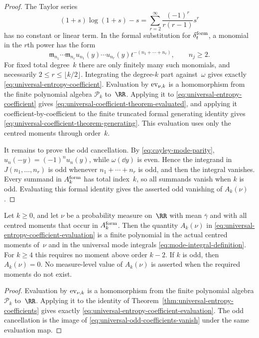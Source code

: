 \begin{proof}
The Taylor series
\[
(1+s)\log(1+s)-s
=\sum_{r=2}^{\infty}\frac{(-1)^r}{r(r-1)}s^r
\]
has no constant or linear term.  In the formal substitution for
$\delta_t^{\rm form}$, a monomial in the $r$th power has the form
\[
\mathfrak m_{n_1}\cdots\mathfrak m_{n_r}
u_{n_1}(y)\cdots u_{n_r}(y)t^{-(n_1+\cdots+n_r)},
\qquad n_j\ge2.
\]
For fixed total degree~$k$ there are only finitely many such monomials, and
necessarily $2\le r\le\lfloor k/2\rfloor$.  Integrating the degree-$k$ part
against~$\omega$ gives exactly \eqref{eq:universal-entropy-coefficient}.
Evaluation by ${\rm ev}_{\nu,k}$ is a homomorphism from the finite polynomial
algebra $\mathcal P_k$ to~$\RR$.  Applying it to
\eqref{eq:universal-entropy-coefficient} gives
\eqref{eq:universal-coefficient-theorem-evaluated}, and applying it
coefficient-by-coefficient to the finite truncated formal generating identity
gives \eqref{eq:universal-coefficient-theorem-generating}.  This evaluation
uses only the centred moments through order~$k$.

It remains to prove the odd cancellation.  By
\eqref{eq:cayley-mode-parity}, $u_n(-y)=(-1)^n u_n(y)$, while
$\omega(\dd y)$ is even.  Hence the integrand in
$J(n_1,\dots,n_r)$ is odd whenever $n_1+\cdots+n_r$ is odd, and then the
integral vanishes.  Every summand in $A_k^{\rm form}$ has total index~$k$, so
all summands vanish when $k$ is odd.  Evaluating this formal identity gives
the asserted odd vanishing of $A_k(\nu)$.
\end{proof}

\begin{proposition}%
\label{prop:universal-entropy-coefficient-evaluation}
Let $k\ge0$, and let $\nu$ be a probability measure on~$\RR$ with mean
$\bar{\gamma}$ and with all centred moments that occur in
$A_k^{\rm form}$.  Then the quantity $A_k(\nu)$ in
\eqref{eq:universal-entropy-coefficient-evaluation} is a finite polynomial in
the actual centred moments of~$\nu$ and in the universal mode integrals
\eqref{eq:mode-integral-definition}.  For \(k\ge4\) this requires no moment
above order \(k-2\).  If $k$ is odd, then $A_k(\nu)=0$.  No measure-level
value of $A_k(\nu)$ is asserted when the required moments do not exist.
\end{proposition}

\begin{proof}
Evaluation by ${\rm ev}_{\nu,k}$ is a homomorphism from the finite polynomial
algebra $\mathcal P_k$ to~$\RR$.  Applying it to the identity of
Theorem~\ref{thm:universal-entropy-coefficients} gives exactly
\eqref{eq:universal-entropy-coefficient-evaluation}.  The odd cancellation is
the image of \eqref{eq:universal-odd-coefficients-vanish} under the same
evaluation map.
\end{proof}

